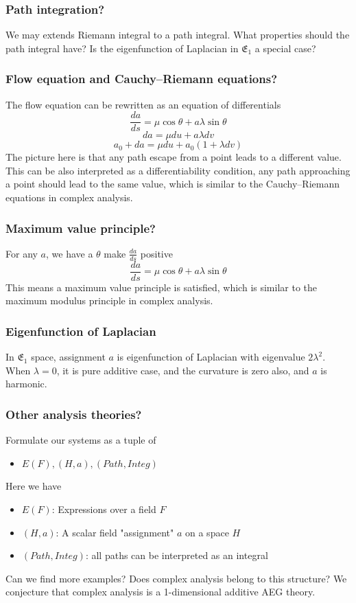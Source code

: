 \documentclass[aspectratio=169]{beamer}
\begin{document}
\begin{frame}
    \frametitle{Path integration?}
    We may extends Riemann integral to a path integral.
    What properties should the path integral have? Is the eigenfunction of Laplacian in $\mathfrak{E}_1$ a special case?
\end{frame}

\begin{frame}
    \frametitle{Flow equation and Cauchy–Riemann equations?}
    The flow equation can be rewritten as an equation of differentials
    \[
        \frac{da}{ds} = \mu \cos \theta + a \lambda \sin \theta
    \]
    \[
        da = \mu du + a \lambda dv
    \]
    \[
        a_0 + da = \mu du + a_0 (1 + \lambda dv)
    \]
    The picture here is that any path escape from a point leads to a different value.
    This can be also interpreted as a differentiability condition, any path approaching a point should lead to the same
    value, which is similar to the Cauchy–Riemann equations in complex analysis.
\end{frame}

\begin{frame}
    \frametitle{Maximum value principle?}
    For any $a$, we have a $\theta$ make $\frac{da}{ds}$ positive
    \[
        \frac{da}{ds} = \mu \cos \theta + a \lambda \sin \theta
    \]
    This means a maximum value principle is satisfied,
    which is similar to the maximum modulus principle in complex analysis.
\end{frame}

\begin{frame}
    \frametitle{Eigenfunction of Laplacian}
    In $\mathfrak{E_1}$ space, assignment $a$ is eigenfunction of Laplacian with eigenvalue $2 \lambda^2$.
    When $\lambda = 0$, it is pure additive case, and the curvature is zero also, and $a$ is harmonic.
\end{frame}

\begin{frame}
    \frametitle{Other analysis theories?}
    Formulate our systems as a tuple of
    \begin{itemize}
        \item $E(F), (H, a), (Path, Integ)$
    \end{itemize}
    Here we have
    \begin{itemize}
        \item $E(F)$: Expressions over a field $F$
        \item $(H, a)$: A scalar field "assignment" $a$ on a space $H$
        \item $(Path, Integ)$: all paths can be interpreted as an integral
    \end{itemize}
    Can we find more examples? Does complex analysis belong to this structure?
    We conjecture that complex analysis is a 1-dimensional additive AEG theory.
\end{frame}
\end{document}

